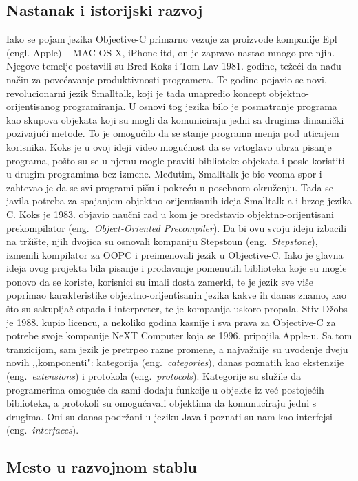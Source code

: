 \documentclass[a4paper]{article}
\begin{document}
\subsection{Nastanak i istorijski razvoj}
\label{subsec:istorija}
Iako se pojam jezika Objective-C primarno vezuje za proizvode kompanije Epl (engl. Apple) -- MAC OS X, iPhone itd, on je zapravo nastao mnogo pre njih. Njegove temelje postavili su Bred Koks i Tom Lav 1981. godine, težeći da nađu način za povećavanje produktivnosti programera. Te godine pojavio se novi, revolucionarni jezik Smalltalk, koji je tada unapredio koncept objektno-orijentisanog programiranja. U osnovi tog jezika bilo je posmatranje programa kao skupova objekata koji su mogli da komuniciraju jedni sa drugima dinamički pozivajući metode. To je omogućilo da se stanje programa menja pod uticajem korisnika. Koks je u ovoj ideji video mogućnost da se vrtoglavo ubrza pisanje programa, pošto su se u njemu mogle praviti biblioteke objekata i posle koristiti u drugim programima bez izmene. Međutim, Smalltalk je bio veoma spor i zahtevao je da se svi programi pišu i pokreću u posebnom okruženju. Tada se javila potreba za spajanjem objektno-orijentisanih ideja Smalltalk-a i brzog jezika C. Koks je 1983. objavio naučni rad u kom je predstavio objektno-orijentisani prekompilator (eng.~{\em Object-Oriented Precompiler}). Da bi ovu svoju ideju izbacili na tržište, njih dvojica su osnovali kompaniju Stepstoun (eng.~{\em Stepstone}), izmenili kompilator za OOPC i preimenovali jezik u Objective-C. Iako je glavna ideja ovog projekta bila pisanje i prodavanje pomenutih biblioteka koje su mogle ponovo da se koriste, korisnici su imali dosta zamerki, te je jezik sve više poprimao karakteristike objektno-orijentisanih jezika kakve ih danas znamo, kao što su sakupljač otpada i interpreter, te je kompanija uskoro propala. Stiv Džobs je 1988. kupio licencu, a nekoliko godina kasnije i sva prava za Objective-C za potrebe svoje kompanije NeXT Computer koja se  1996. pripojila Apple-u. Sa tom tranzicijom, sam jezik je pretrpeo razne promene, a najvažnije su uvođenje dveju novih ,,komponenti": kategorija (eng.~{\em categories}), danas poznatih kao ekstenzije (eng.~{\em extensions}) i protokola (eng.~{\em protocols}). Kategorije su služile da programerima omoguće da sami dodaju funkcije u objekte iz već postojećih biblioteka, a protokoli su omogućavali objektima da komunuciraju jedni s drugima. Oni su danas podržani u jeziku Java i poznati su nam kao interfejsi (eng.~{\em interfaces}). 

\subsection{Mesto u razvojnom stablu}
\label{subsec:stablo}
\end{document}
